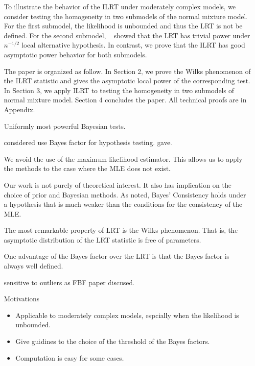 \documentclass[11pt]{article}
\theoremstyle{plain}
\theoremstyle{definition}
\theoremstyle{remark}
\begin{document}
To illustrate the behavior of the ILRT under moderately complex models, we consider testing the homogeneity in two submodels of the normal mixture model.
For the first submodel, the likelihood is unbounded and thus the LRT is not be defined.
For the second submodel, %
~\cite{HALL2005158} showed that the LRT has trivial power under $n^{-1/2}$ local alternative hypothesis. 
In contrast, we prove that the ILRT has good asymptotic power behavior for both submodels.



The paper is organized as follow.
In Section 2, we prove the Wilks phenomenon of the ILRT statistic and gives the asymptotic local power of the corresponding test.
In Section 3, we apply ILRT to testing the homogeneity in two submodels of normal mixture model.
Section 4 concludes the paper.
All technical proofs are in Appendix.




Uniformly most powerful Bayesian tests.

\cite{clarke1990information} considered use Bayes factor for hypothesis testing.
\cite{Gelfand1994} gave.

We avoid the use of the maximum likelihood estimator.
This allows us to apply the methods to the case where the MLE does not exist.


Our work is not purely of theoretical interest.
It also has implication on the choice of prior and Bayesian methods.
As \cite{clarke1990information} noted, Bayes' Consistency holds under a hypothesis that is much weaker than the conditions for the consistency of the MLE.

The most remarkable property of LRT is the Wilks phenomenon. That is, the asymptotic distribution of the LRT statistic is free of parameters.

One advantage of the Bayes factor over the LRT is that the Bayes factor is always well defined.

sensitive to outliers as FBF paper discused.


Motivations
\begin{itemize}
    \item 
        Applicable to moderately complex models, espcially when the likelihood is unbounded.
    \item
        Give guidines to the choice of the threshold of the Bayes factors.
    \item
        Computation is easy for some cases.
\end{itemize}
\end{document}

